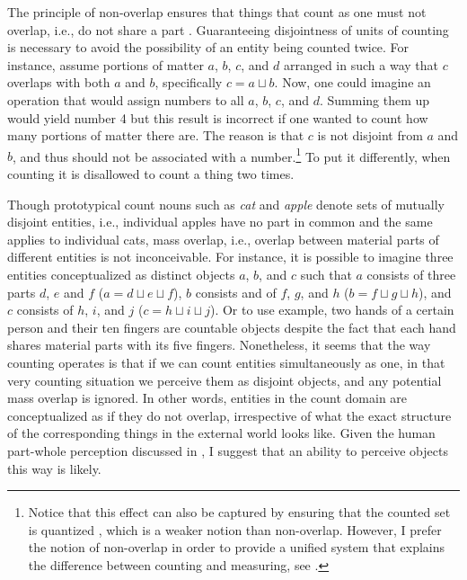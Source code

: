 The principle of non-overlap ensures that things that count as one must not overlap, i.e., do not share a part \citep[see][]{landman2011count,landman2016iceberg}. Guaranteeing disjointness of units of counting is necessary to avoid the possibility of an entity being counted twice. For instance, assume portions of matter $a$, $b$, $c$, and $d$ arranged in such a way that $c$ overlaps with both $a$ and $b$, specifically $c = a\sqcup b$. Now, one could imagine an operation that would assign numbers to all $a$, $b$, $c$, and $d$. Summing them up would yield number 4 but this result is incorrect if one wanted to count how many portions of matter there are. The reason is that $c$ is not disjoint from $a$ and $b$, and thus should not be associated with a number.\footnote{Notice that this effect can also be captured by ensuring that the counted set is quantized \citep{krifka1989nominal}, which is a weaker notion than non-overlap. However, I prefer the notion of non-overlap in order to provide a unified system that explains the difference between counting and measuring, see .} To put it differently, when counting it is disallowed to count a thing two times.  

Though prototypical count nouns such as \textit{cat} and \textit{apple} denote sets of mutually disjoint entities, i.e., individual apples have no part in common and the same applies to individual cats, mass overlap, i.e., overlap between material parts of different entities is not inconceivable. For instance, it is possible to imagine three entities conceptualized as distinct objects $a$, $b$, and $c$ such that $a$ consists of three parts $d$, $e$ and $f$ ($a = d\sqcup e \sqcup f$), $b$ consists and of $f$, $g$, and $h$ ($b = f\sqcup g \sqcup h$), and $c$ consists of $h$, $i$, and $j$ ($c = h\sqcup i \sqcup j$). Or to use  example, two hands of a certain person and their ten fingers are countable objects despite the fact that each hand shares material parts with its five fingers. Nonetheless, it seems that the way counting operates is that if we can count entities simultaneously as one, in that very counting situation we perceive them as disjoint objects, and any potential mass overlap is ignored. In other words, entities in the count domain are conceptualized as if they do not overlap, irrespective of what the exact structure of the corresponding things in the external world looks like. Given the human part-whole perception discussed in , I suggest that an ability to perceive objects this way is likely. 

